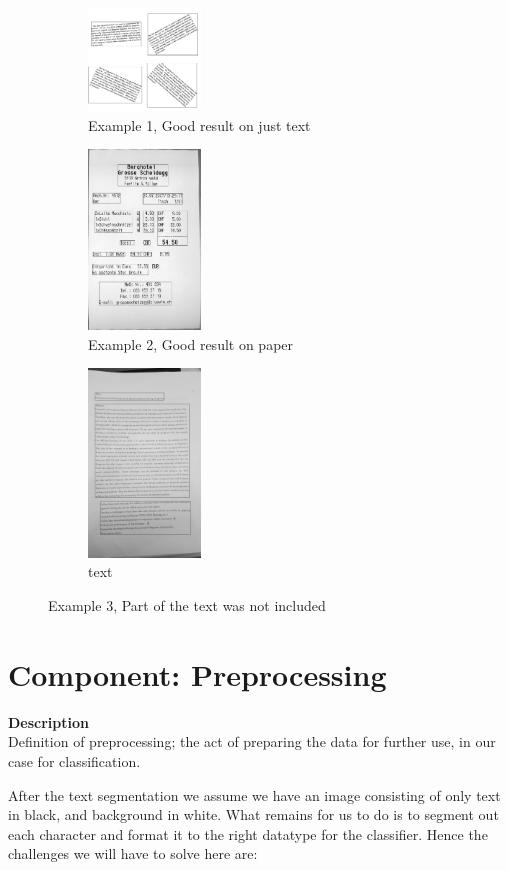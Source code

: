 \documentclass[11pt,a4paper,UKenglish]{report}
\begin{document}
\begin{figure}[h]
  \centering
  \begin{subfigure}[t]{4cm}
    \includegraphics[width=3cm]{res/segment_text1.png}
    \caption{Example 1, Good result on just text}
  \end{subfigure}
  \hspace{5mm}%
  \begin{subfigure}[t]{4cm}
    \includegraphics[width=3cm]{res/segment_text2.png}
    \caption{Example 2, Good result on paper}
  \end{subfigure}
  \hspace{5mm}%
  \begin{subfigure}[t]{4cm}
    \includegraphics[width=3cm]{res/segment_text3.png}
    \caption{text}
  \end{subfigure}
  \caption{Example 3, Part of the text was not included}
  \label{fig:Text_detection_approaches}
\end{figure}










\section{Component: Preprocessing}
\label{Method:Preprocessing}
\textbf{Description} \\
Definition of preprocessing; the act of preparing the data for further use,
in our case for classification. \par
After the text segmentation we assume we have an image consisting of only text
in black, and background in white. What remains for us to do is to segment out
each character and format it to the right datatype for the classifier. Hence
the challenges we will have to solve here are:
\end{document}
